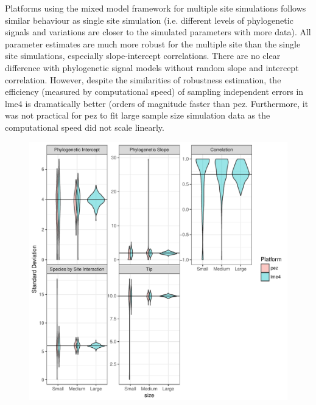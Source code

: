 Platforms using the mixed model framework for multiple site simulations follows similar behaviour as single site simulation (i.e. different levels of phylogenetic signals and variations are closer to the simulated parameters with more data). 
All parameter estimates are much more robust for the multiple site than the single site simulations, especially slope-intercept correlations. 
There are no clear difference with phylogenetic signal models without random slope and intercept correlation.
However, despite the similarities of robustness estimation, the efficiency (measured by computational speed) of sampling independent errors in lme4 is dramatically better (orders of magnitude faster than pez.
Furthermore, it was not practical for pez to fit large sample size simulation data as the computational speed did not scale linearly.

\begin{center}
\begin{figure}[h]
\includegraphics[scale=0.8,page=1]{./csplot.pdf}
\end{figure}
\end{center}

